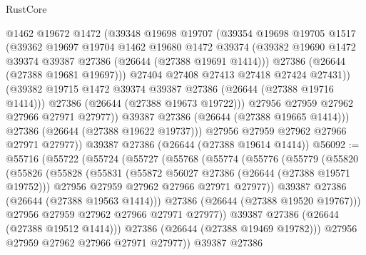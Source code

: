 \begin{lexlean}{RustCore}
\begin{coremodule}
                  @1462
                  @19672
                  @1472
                  (@39348
                    @19698
                    @19707
                    (@39354
                      @19698
                      @19705
                      @1517
                      (@39362
                        @19697
                        @19704
                        @1462
                        @19680
                        @1472
                        @39374
                        (@39382 @19690 @1472 @39374 @39387 @27386 (@26644 (@27388 @19691 @1414)))
                        @27386
                        (@26644 (@27388 @19681 @19697)))
                      @27404
                      @27408
                      @27413
                      @27418
                      @27424
                      @27431))
                  (@39382 @19715 @1472 @39374 @39387 @27386 (@26644 (@27388 @19716 @1414)))
                  @27386
                  (@26644 (@27388 @19673 @19722)))
                @27956
                @27959
                @27962
                @27966
                @27971
                @27977))
            @39387
            @27386
            (@26644 (@27388 @19665 @1414)))
          @27386
          (@26644 (@27388 @19622 @19737)))
        @27956
        @27959
        @27962
        @27966
        @27971
        @27977))
    @39387
    @27386
    (@26644 (@27388 @19614 @1414))
@56092 := @55716
    (@55722
      (@55724
        (@55727
          (@55768
            (@55774
              (@55776
                (@55779
                  (@55820
                    (@55826
                      (@55828
                        (@55831
                          (@55872 @56027 @27386 (@26644 (@27388 @19571 @19752)))
                          @27956
                          @27959
                          @27962
                          @27966
                          @27971
                          @27977))
                      @39387
                      @27386
                      (@26644 (@27388 @19563 @1414)))
                    @27386
                    (@26644 (@27388 @19520 @19767)))
                  @27956
                  @27959
                  @27962
                  @27966
                  @27971
                  @27977))
              @39387
              @27386
              (@26644 (@27388 @19512 @1414)))
            @27386
            (@26644 (@27388 @19469 @19782)))
          @27956
          @27959
          @27962
          @27966
          @27971
          @27977))
      @39387
      @27386

\end{coremodule}
\end{lexlean}
